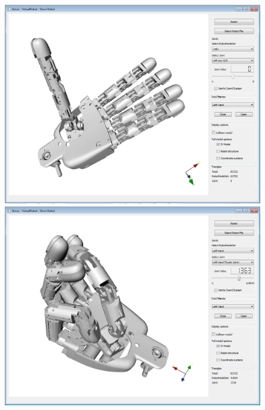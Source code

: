\begin{figure}[H]
	\centering
	\begin{minipage} {.45\linewidth}
	  \includegraphics[width=\linewidth]{Tutorial9}
	\end{minipage}
	\begin{minipage} {.45\linewidth}
	  \includegraphics[width=\linewidth]{Tutorial9c}
	\end{minipage}	
\end{figure}	
